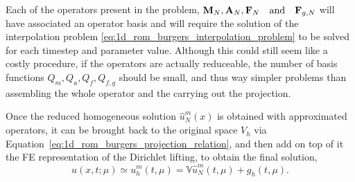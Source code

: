 \documentclass[../../thesis.tex]{subfiles}
\newcommand{\rbV}{\ensuremath{\mathbb{V}}}
\begin{document}
Each of the operators present in the problem, $\vb{M}_N, \vb{A}_N, \vb{F}_N \qqtext{and} \vb{F}_{g,N}$ will have associated an operator basis and will require the solution of the interpolation problem \eqref{eq:1d_rom_burgers_interpolation_problem} to be solved for each timestep and parameter value.
Although this could still seem like a costly procedure, if the operators are actually reduceable, the number of basis functions $Q_m, Q_a, Q_f, Q_{f,g}$ should be small, and thus way simpler problems than assembling the whole operator and the carrying out the projection. 


Once the reduced homogeneous solution $\hat{u}^{m}_N(x)$ is obtained with approximated operators, it can be brought back to the original space $V_h$ via Equation~\eqref{eq:1d_rom_burgers_projection_relation}, and then add on top of it the FE representation of the Dirichlet lifting, to obtain the final solution,
\begin{equation}
    u(x, t; \mu) \simeq u_h^{m}(t, \mu) = \rbV \hat{u}^{m}_N(t, \mu) + g_h(t,\mu).
\end{equation}

\end{document}
